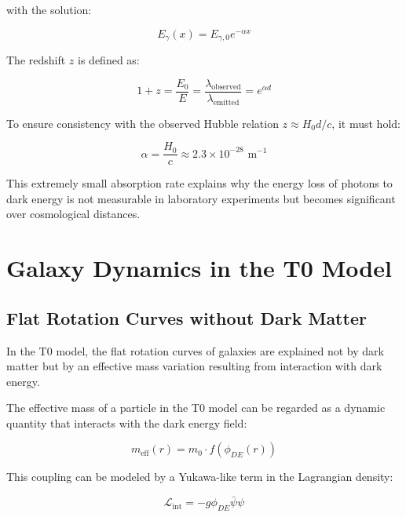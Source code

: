 \documentclass[a4paper,12pt]{article}
\theoremstyle{definition}
\theoremstyle{remark}
\begin{document}
	with the solution:
	
	\begin{equation}
		E_{\gamma}(x) = E_{\gamma,0} e^{-\alpha x}
	\end{equation}
	
	The redshift $z$ is defined as:
	
	\begin{equation}
		1 + z = \frac{E_0}{E} = \frac{\lambda_{\text{observed}}}{\lambda_{\text{emitted}}} = e^{\alpha d}
	\end{equation}
	
	To ensure consistency with the observed Hubble relation $z \approx H_0 d/c$, it must hold:
	
	\begin{equation}
		\alpha = \frac{H_0}{c} \approx 2.3 \times 10^{-28} \text{ m}^{-1}
	\end{equation}
	
	This extremely small absorption rate explains why the energy loss of photons to dark energy is not measurable in laboratory experiments but becomes significant over cosmological distances.
	
	\section{Galaxy Dynamics in the T0 Model}
	
	\subsection{Flat Rotation Curves without Dark Matter}
	
	In the T0 model, the flat rotation curves of galaxies are explained not by dark matter but by an effective mass variation resulting from interaction with dark energy.
	
	The effective mass of a particle in the T0 model can be regarded as a dynamic quantity that interacts with the dark energy field:
	
	\begin{equation}
		m_{\text{eff}}(r) = m_0 \cdot f(\phi_{DE}(r))
	\end{equation}
	
	This coupling can be modeled by a Yukawa-like term in the Lagrangian density:
	
	\begin{equation}
		\mathcal{L}_{\text{int}} = -g \phi_{DE} \bar{\psi}\psi
	\end{equation}
	
\end{document}
